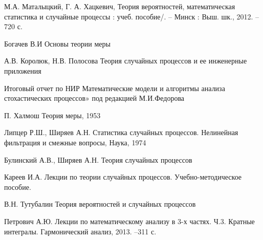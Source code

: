 \begin{thebibliography}{}
	 М.А. Маталыцкий,
	Г. А. Хацкевич, Теория вероятностей, математическая статистика и
	случайные процессы : учеб. пособие/. – Минск : Выш. шк., 2012. – 720 с.
	
	 Богачев В.И Основы теории меры
	
	  А.В. Королюк, Н.В. Полосова Теория случайных процессов и ее инженерные приложения
	
	 Итоговый отчет по НИР Математические модели и алгоритмы анализа стохастических процессов» под редакцией М.И.Федорова
	
	 П. Халмош Теория меры, 1953
	
	 Липцер Р.Ш., Ширяев А.Н. Статистика случайных процессов. Нелинейная фильтрация и смежные вопросы, Наука, 1974
	
	 Булинский А.В., Ширяев А.Н. Теория случайных процессов
	
	 Кареев И.А. Лекции по теории случайных процессов. Учебно-методическое пособие.
	
	 В.Н. Тутубалин Теория вероятностей и случайных процессов
	
	   Петрович А.Ю. Лекции по математическому анализу в 3-х частях. Ч.3. Кратные интегралы. Гармонический анализ, 2013. --311 с.
	
	
\end{thebibliography}


